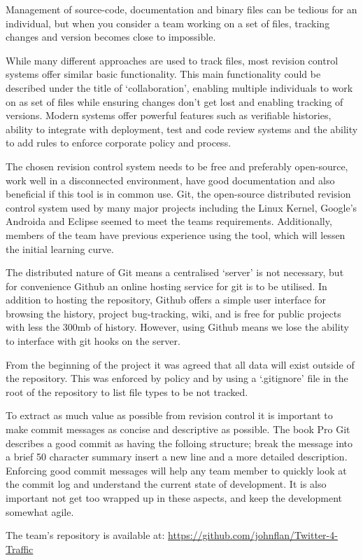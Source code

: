 Management of source-code, documentation and binary files can be tedious for an individual, but when you consider a team working on a set of files, tracking changes and version becomes close to impossible.

While many different approaches are used to track files, most revision control systems offer
similar basic functionality. This main functionality could be described under
the title of ‘collaboration’, enabling multiple individuals to work on as set of
files while ensuring changes don’t get lost and enabling tracking of versions.
Modern systems offer powerful features such as verifiable histories, ability to integrate with deployment, test and code review systems and the ability to add rules to enforce corporate policy and process.

The chosen revision control system needs to be free and preferably open-source,
work well in a disconnected environment, have good documentation and also
beneficial if this tool is in common use. Git\cite{website:git_scm}, the
open-source distributed revision control system used by many major projects
including the Linux Kernel, Google’s Androida and Eclipse seemed to meet the
teams requirements. Additionally, members of the team have previous experience using the tool, which will lessen the initial learning curve.

The distributed nature of Git means a centralised ‘server’ is not necessary,
but for convenience Github\cite{website:github} an online hosting service for
git is to be utilised. In addition to hosting the repository, Github offers a
simple user interface for browsing the history, project bug-tracking, wiki, and
is free for public projects with less the 300mb of history. However, using
Github means we lose the ability to interface with git hooks on the server. 

From the beginning of the project it was agreed that all data will exist
outside of the repository. This was enforced by policy and by using a ‘.gitignore’ file in the root of the repository to list file types to be not tracked.  

To extract as much value as possible from revision control it is important to
make commit messages as concise and descriptive as possible. The book Pro
Git\cite{website:pro_git_ch2} describes a good commit as having the folloing
structure; break the message into a brief 50 character summary insert a new line and a more detailed
description. Enforcing good commit messages will help any team member to
quickly look at the commit log and understand the current state of development.
It is also important not get too wrapped up in these aspects, and keep the development somewhat agile.

The team’s repository is available at: \url{https://github.com/johnflan/Twitter-4-Traffic}
\pagebreak 
